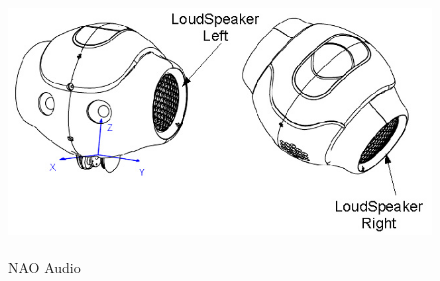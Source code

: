 \begin{figure}
	[h] \centering 
	\includegraphics[height=7cm]{figures/content/nao-audio.jpg} \caption{NAO Audio} \label{fg:nao:audio} 
\end{figure}
